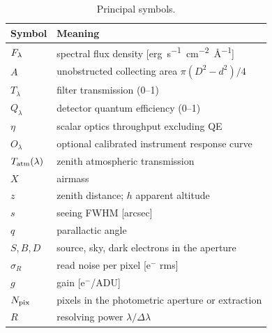 \begin{table}
\centering
\caption{Principal symbols.}
\label{tab:symbols}
\begin{tabular}{ll}
\toprule
Symbol & Meaning \\
\midrule
$F_\lambda$        & spectral flux density [\si{erg.s^{-1}.cm^{-2}.\angstrom^{-1}}] \\
$A$            & unobstructed collecting area $\pi(D^2-d^2)/4$ \\
$T_\lambda$    & filter transmission (0--1) \\
$Q_\lambda$    & detector quantum efficiency (0--1) \\
$\eta$         & scalar optics throughput excluding QE \\
$O_\lambda$    & optional calibrated instrument response curve \\
$T_{\rm atm}(\lambda)$ & zenith atmospheric transmission \\
$X$            & airmass \\
$z$            & zenith distance; $h$ apparent altitude \\
$s$            & seeing FWHM [arcsec] \\
$q$            & parallactic angle \\
$S,B,D$        & source, sky, dark electrons in the aperture \\
$\sigma_R$     & read noise per pixel [e$^-$ rms] \\
$g$            & gain [e$^-$/ADU] \\
$N_{\rm pix}$  & pixels in the photometric aperture or extraction \\
$R$            & resolving power $\lambda/\Delta\lambda$ \\
\bottomrule
\end{tabular}
\end{table}
